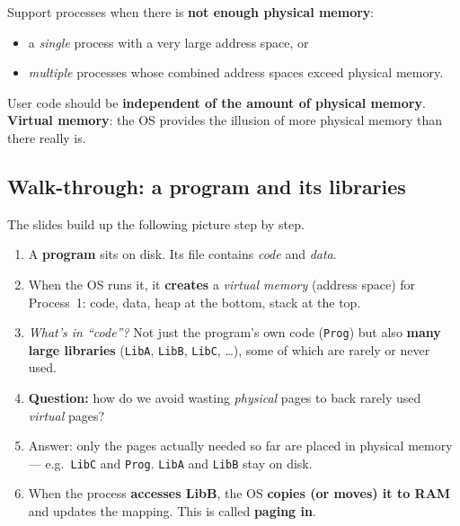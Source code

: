 \documentclass[11pt,a4paper]{article}
\begin{document}
\begin{keybox}[OS goal]
Support processes when there is \textbf{not enough physical memory}:
\begin{itemize}
  \item a \emph{single} process with a very large address space, or
  \item \emph{multiple} processes whose combined address spaces exceed
        physical memory.
\end{itemize}
User code should be \textbf{independent of the amount of physical
memory}. \textbf{Virtual memory}: the OS provides the illusion of more
physical memory than there really is.
\end{keybox}

\subsection{Walk-through: a program and its libraries}

The slides build up the following picture step by step.

\begin{enumerate}
  \item A \textbf{program} sits on disk. Its file contains \emph{code}
        and \emph{data}.
  \item When the OS runs it, it \textbf{creates} a \emph{virtual
        memory} (address space) for Process~1: code, data, heap at the
        bottom, stack at the top.
  \item \emph{What's in ``code''?} Not just the program's own code
        (\texttt{Prog}) but also \textbf{many large libraries}
        (\texttt{LibA}, \texttt{LibB}, \texttt{LibC}, \ldots), some of which are
        rarely or never used.
  \item \textbf{Question:} how do we avoid wasting \emph{physical} pages
        to back rarely used \emph{virtual} pages?
  \item Answer: only the pages actually needed so far are placed in
        physical memory --- e.g.\ \texttt{LibC} and \texttt{Prog}.
        \texttt{LibA} and \texttt{LibB} stay on disk.
  \item When the process \textbf{accesses LibB}, the OS
        \textbf{copies (or moves) it to RAM} and updates the mapping.
        This is called \textbf{paging in}.
\end{enumerate}
\end{document}
